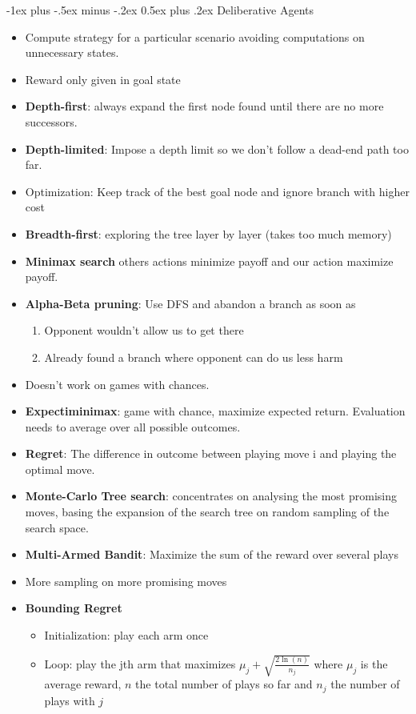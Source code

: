 \documentclass[10pt,a4paper,landscape]{article}
\makeatletter
\renewcommand{\section}{\@startsection{section}{1}{0mm}%
                                {-1ex plus -.5ex minus -.2ex}%
                                {0.5ex plus .2ex}%
                                {\normalfont\small\bfseries}}
\makeatother
\begin{document}
\begin{multicols*}{2}
\section{Deliberative Agents}
\begin{itemize}
	\item Compute strategy for a particular scenario avoiding computations on unnecessary states.
	\item Reward only given in goal state
	\item \textbf{Depth-first}: always expand the first node found until there are no more successors.
	\item \textbf{Depth-limited}: Impose a depth limit so we don't follow a dead-end path too far.
	\item Optimization: Keep track of the best goal node and ignore branch with higher cost
	\item \textbf{Breadth-first}: exploring the tree layer by layer (takes too much memory)
	\item \textbf{Minimax search} others actions minimize payoff and our action maximize payoff.
	\item \textbf{Alpha-Beta pruning}: Use DFS and abandon a branch as soon as
	\begin{enumerate}
		\item Opponent wouldn't allow us to get there
		\item Already found a branch where opponent can do us less harm
	\end{enumerate}
	\item Doesn't work on games with chances.
	\item \textbf{Expectiminimax}: game with chance, maximize expected return. Evaluation needs to average over all possible outcomes.
	\item \textbf{Regret}: The difference in outcome between playing move i and playing the optimal move.
	\item \textbf{Monte-Carlo Tree search}: concentrates on analysing the most promising moves, basing the expansion of the search tree on random sampling of the search space.
	\item \textbf{Multi-Armed Bandit}: Maximize the sum of the reward over several plays
	\item More sampling on more promising moves
	\item \textbf{Bounding Regret}
	\begin{itemize}
		\item Initialization: play each arm once
		\item Loop: play the jth arm that maximizes $\mu_j + \sqrt{\frac{2 \ln(n)}{n_j}}$
		where $\mu_j$ is the average reward, $n$ the total number of plays so far and $n_j$ the number of plays with $j$
	\end{itemize}
\end{itemize}


\end{multicols*}
\end{document}
